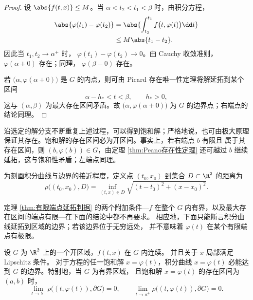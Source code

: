 \begin{proof}
	设 $\abs{f(t,x)}\leq M$。当
	$\alpha<t_2<t_1<\beta$ 时，由积分方程，
	\[
		\begin{aligned}
		\abs{\varphi(t_1)-\varphi(t_2)}
		&=\abs{\int_{t_2}^{t_1}
		f\bigl(t,\varphi(t)\bigr)\dd t}\\
		&\leq M\abs{t_1-t_2}.
		\end{aligned}
	\]
	因此当 $t_1,t_2\to\alpha^+$ 时，
	$\varphi(t_1)-\varphi(t_2)\to0$。由 Cauchy 收敛准则，
	$\varphi(\alpha+0)$ 存在；同理，
	$\varphi(\beta-0)$ 存在。

	若 $\bigl(\alpha,\varphi(\alpha+0)\bigr)$ 是 $G$ 的内点，则可由
	Picard 存在唯一性定理将解延拓到某个区间
	\[
		\alpha-h_*<t<\beta,
		\qquad h_*>0,
	\]
	这与 $(\alpha,\beta)$ 为最大存在区间矛盾。故
	$\bigl(\alpha,\varphi(\alpha+0)\bigr)$ 为 $G$ 的边界点；右端点的
	结论同理。
\end{proof}

沿选定的解分支不断重复上述过程，可以得到饱和解；严格地说，也可由极大原理
保证其存在。饱和解的存在区间必为开区间。事实上，若右端点 $b$ 有限且
属于其存在区间，则 $(b,\varphi(b))\in G$，由定理
\ref{thm:Peano存在性定理} 还可越过
$b$ 继续延拓，这与饱和性矛盾；左端点同理。

为刻画积分曲线与边界的接近程度，定义点 $(t_0,x_0)$ 到集合
$D\subset\R^2$ 的距离为
\[
	\rho\bigl((t_0,x_0),D\bigr)
	=\inf_{(t,x)\in D}
	\sqrt{(t-t_0)^2+(x-x_0)^2}.
\]

定理 \ref{thm:有限端点延拓判据} 的两个附加条件---$f$ 在整个
$G$ 内有界，以及最大存在区间的端点有限---在下面的结论中都不再要求。
相应地，下面只能断言积分曲线延拓到区域的边界；若该边界位于无穷远处，
并不意味着 $\varphi(t)$ 在某个有限端点有极限。

\begin{theorem}[解的延拓定理]\label{thm:解的延拓定理}
	设 $G$ 为 $\R^2$ 上的一个开区域，$f(t,x)$ 在 $G$ 内连续。
	并且关于 $x$ 局部满足 Lipschitz 条件。
	对于方程的任一饱和解 $x=\varphi(t)$，积分曲线
	$x=\varphi(t)$ 必能达到 $G$ 的边界。特别地，当 $G$ 为有界区域，
	且饱和解 $x=\varphi(t)$ 的存在区间为 $(a,b)$ 时，
	\[
		\lim_{t\to b^-}
		\rho\bigl((t,\varphi(t)),\partial G\bigr)=0,
		\qquad
		\lim_{t\to a^+}
		\rho\bigl((t,\varphi(t)),\partial G\bigr)=0.
	\]
\end{theorem}

